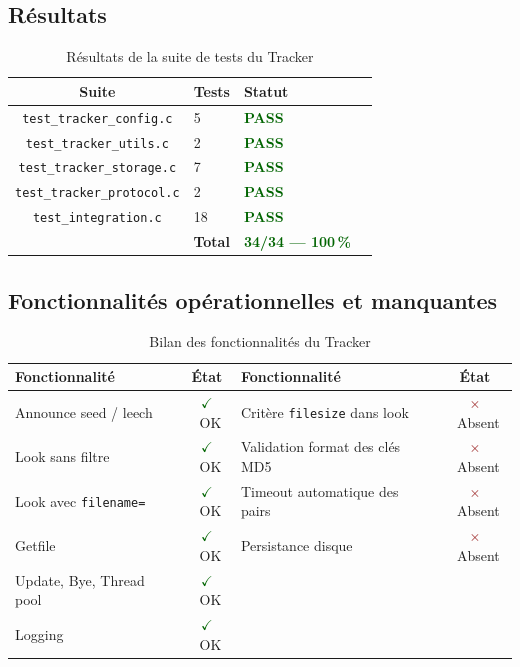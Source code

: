 \documentclass[11pt, a4paper]{article}
\newcommand{\coche}{\textcolor{darkgreen}{$\checkmark$}}
\newcommand{\croix}{\textcolor{darkred}{$\times$}}
\begin{document}
\subsection{Résultats}

\begin{table}[H]
\centering
\begin{tabular}{clll}
\toprule
\textbf{Suite} & \textbf{Tests} & \textbf{Statut} \\
\midrule
\texttt{test\_tracker\_config.c}   & 5  & \textcolor{darkgreen}{\textbf{PASS}} \\
\texttt{test\_tracker\_utils.c}    & 2  & \textcolor{darkgreen}{\textbf{PASS}} \\
\texttt{test\_tracker\_storage.c}  & 7  & \textcolor{darkgreen}{\textbf{PASS}} \\
\texttt{test\_tracker\_protocol.c} & 2  & \textcolor{darkgreen}{\textbf{PASS}} \\
\texttt{test\_integration.c}       & 18 & \textcolor{darkgreen}{\textbf{PASS}} \\
\midrule
\multicolumn{2}{r}{\textbf{Total}} & \textcolor{darkgreen}{\textbf{34/34 --- 100\,\%}} \\
\bottomrule
\end{tabular}
\caption{Résultats de la suite de tests du Tracker}
\end{table}

\subsection{Fonctionnalités opérationnelles et manquantes}

\begin{table}[H]
\centering
\begin{tabular}{lc@{\hspace{1.2cm}}lc}
\toprule
\textbf{Fonctionnalité} & \textbf{État} & \textbf{Fonctionnalité} & \textbf{État} \\
\midrule
Announce seed / leech        & \coche~OK & Critère \texttt{filesize} dans look & \croix~Absent \\
Look sans filtre             & \coche~OK & Validation format des clés MD5      & \croix~Absent \\
Look avec \texttt{filename=} & \coche~OK & Timeout automatique des pairs       & \croix~Absent \\
Getfile                      & \coche~OK & Persistance disque                  & \croix~Absent \\
Update, Bye, Thread pool     & \coche~OK & & \\
Logging                      & \coche~OK & & \\
\bottomrule
\end{tabular}
\caption{Bilan des fonctionnalités du Tracker}
\end{table}
\end{document}
